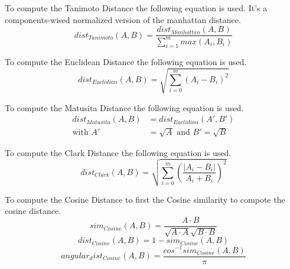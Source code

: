\begin{definition}
  To compute the Tanimoto Distance the following equation is used. It's a components-wised normalized version of the manhattan distance.
  \begin{equation}
    dist_{Tanimoto}(A, B) = \frac{dist_{Manhattan}(A, B)}{\sum_{i=1}^{m} max(A_i, B_i)}
  \end{equation}
\end{definition}

\begin{definition}
  To compute the Euclidean Distance the following equation is used.
  \begin{equation}
    dist_{Euclidian}(A, B) = \sqrt{\sum_{i=0}^{m}(A_i - B_i)^2}
  \end{equation}
\end{definition}

\begin{definition}
  To compute the Matusita Distance the following equation is used.
  \begin{equation}
    \begin{split}
      dist_{Matusita}(A, B) &= dist_{Euclidian}(A', B') \\
      \text{with }A' &= \sqrt{A}\text{ and }B' = \sqrt{B}
    \end{split}
  \end{equation}
\end{definition}

\begin{definition}
  To compute the Clark Distance the following equation is used.
  \begin{equation}
    dist_{Clark}(A, B) = \sqrt{\sum_{i=0}^{m}\left(\frac{|A_i - B_i|}{A_i + B_i}\right)^2}
  \end{equation}
\end{definition}

\begin{definition}
  To compute the Cosine Distance to first the Cosine similarity to compote the cosine distance.
  \begin{equation}
    sim_{Cosine}(A, B) = \frac{A \cdot B}{\sqrt{A \cdot A}\sqrt{B \cdot B}}
  \end{equation}
  \begin{equation}
    dist_{Cosine}(A, B) = 1 - sim_{Cosine}(A, B)
  \end{equation}
  \begin{equation}
    angular_dist_{Cosine}(A, B) = \frac{cos^{-1}sim_{Cosine}(A, B)}{\pi}
  \end{equation}
\end{definition}

